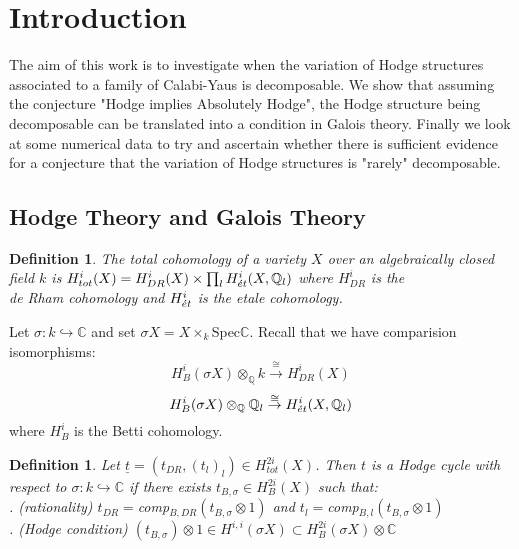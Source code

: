 \documentclass[12pt,titlepage]{article}
\newtheorem{definition}[lem]{Definition}
\begin{document}
\section{Introduction}
The aim of this work is to investigate when the variation of Hodge
structures associated to a family of Calabi-Yaus is decomposable.
We show that assuming the conjecture "Hodge implies Absolutely
Hodge", the Hodge structure being decomposable can be translated
into a condition in Galois theory.  Finally we look at some
numerical data to try and ascertain whether there is sufficient
evidence for a conjecture that the variation of Hodge structures
is "rarely" decomposable.

\subsection{Hodge Theory and Galois Theory}

\begin{definition}
    The \emph{total cohomology} of a variety $X$ over an algebraically closed field $k$ is
   $H^{i}_{tot}(X) = H^{i}_{DR}(X) \times \prod_{l} H^{i}_{\Acute{e}t}(X,\mathbb{Q}_{l})$ where $H^{i}_{DR}$ is the \\ de Rham
    cohomology and $H^{i}_{\Acute{e}t}$ is the etale cohomology.
\end{definition}

Let $\sigma : k \hookrightarrow \mathbb{C}$ and set $\sigma X = X \times_{k} $Spec$ \mathbb{C}$.  Recall that we have comparision isomorphisms:
\[H^{i}_{B}(\sigma X) \otimes_{\mathbb{Q}} k \overset{\cong}{\rightarrow} H^{i}_{DR}(X)\]
\[H^{i}_{B}(\sigma X) \otimes_{\mathbb{Q}} \mathbb{Q}_{l} \overset{\cong}{\rightarrow} H^{i}_{\Acute{e}t}(X,\mathbb{Q}_{l})\]
where $H^{i}_{B}$ is the Betti cohomology.

\begin{definition}
  Let $\underline{t} = (t_{DR} , (t_{l})_{l}) \in H^{2i}_{tot}(X)$.  Then $t$ is a \emph{Hodge cycle} with respect to
   $\sigma : k \hookrightarrow \mathbb{C}$ if there exists $t_{B,\sigma} \in H^{2i}_{B}(X)$ such that:\\
     . (rationality) $t_{DR} = $comp$_{B,DR}(t_{B,\sigma} \otimes 1)$ and $t_{l} =
        $comp$_{B,l}(t_{B,\sigma}\otimes 1)$\\
     . (Hodge condition) $(t_{B,\sigma}) \otimes 1 \in H^{i,i}(\sigma X) \subset H^{2i}_{B}(\sigma X) \otimes
        \mathbb{C}$
\end{definition}
\end{document}
